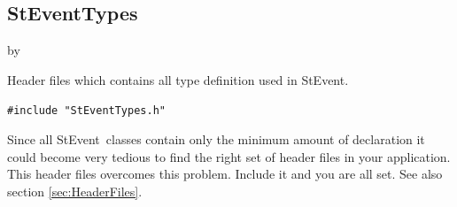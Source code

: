 \documentclass[twoside]{article}
\newcommand{\StEvent}{\textsf{StEvent}}
\newcommand{\entrylabel}[1]{\mbox{\textbf{{#1}}}\hfil}%
\newenvironment{entry}
{\begin{list}{}%
    {\renewcommand{\makelabel}{\entrylabel}%
     \setlength{\labelwidth}{90pt}%
     \setlength{\leftmargin}{\labelwidth}
     \advance\leftmargin by \labelsep%
      }%
    }%
  {\end{list}}
\newcommand{\Entrylabel}[1]%
{\raisebox{0pt}[1ex][0pt]{\makebox[\labelwidth][l]%
    {\parbox[t]{\labelwidth}{\hspace{0pt}\textbf{{#1}}}}}}
\newenvironment{Entry}%
{\renewcommand{\entrylabel}{\Entrylabel}\begin{entry}}%
  {\end{entry}}
\begin{document}
\subsection{StEventTypes}
\label{sec:StEventTypes}
\begin{Entry}
\item[Summary] Header files which contains all type definition used in
    \StEvent.
\item[Synopsis]
    \verb+#include "StEventTypes.h"+\\
\item[Description] Since all \StEvent\ classes contain only the
    minimum amount of declaration it could become very tedious to find
    the right set of header files in your application.  This header
    files overcomes this problem. Include it and you are all set.  See
    also section \ref{sec:HeaderFiles}.
\end{Entry}
\clearpage
\end{document}
